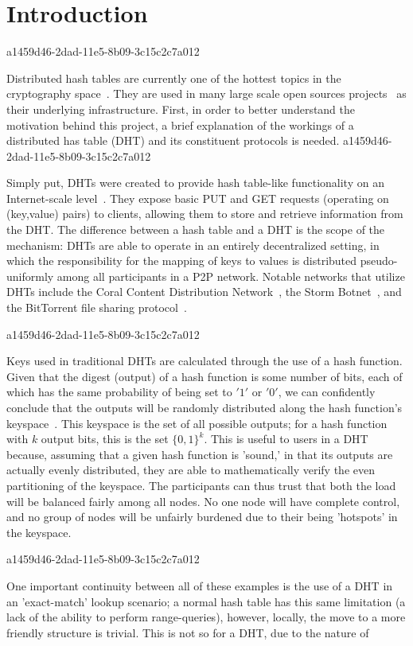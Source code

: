 \documentclass[12pt]{article}
\begin{document}
\section{Introduction}
a1459d46-2dad-11e5-8b09-3c15c2c7a012\par Distributed hash tables are currently one of the hottest topics in the cryptography space~\cite{Stoica:2001dj,Rowstron:2001ea,Ratnasamy:2001wn}. They are used in many large scale open sources projects~\cite{Freitas:2013tb,Xu:2010vs,Perfitt:2010fh} as their underlying infrastructure. First, in order to better understand the motivation behind this project, a brief explanation of the workings of a distributed has table (DHT) and its constituent protocols is needed.
a1459d46-2dad-11e5-8b09-3c15c2c7a012
\par Simply put, DHTs were created to provide hash table-like functionality on an Internet-scale level~\cite{Ratnasamy:2001wn}. They expose basic PUT and GET requests (operating on (key,value) pairs) to clients, allowing them to store and retrieve information from the DHT. The difference between a hash table and a DHT is the scope of the mechanism: DHTs are able to operate in an entirely decentralized setting, in which the responsibility for the mapping of keys to values is distributed pseudo-uniformly among all participants in a P2P network. Notable networks that utilize DHTs include the Coral Content Distribution Network~\cite{Freedman:2004vb}, the Storm Botnet~\cite{Holz:2008uk}, and the BitTorrent file sharing protocol~\cite{Cohen:y1_8mBnw}.

a1459d46-2dad-11e5-8b09-3c15c2c7a012\par Keys used in traditional DHTs are calculated through the use of a hash function. Given that the digest (output) of a hash function is some number of bits, each of which has the same probability of being set to $'1'$ or $'0'$, we can confidently conclude that the outputs will be randomly distributed along the hash function's keyspace~. This keyspace is the set of all possible outputs; for a hash function with $k$ output bits, this is the set $\{0,1\}^k$. This is useful to users in a DHT because, assuming that a given hash function is 'sound,' in that its outputs are actually evenly distributed, they are able to mathematically verify the even partitioning of the keyspace. The participants can thus trust that both the load will be balanced fairly among all nodes. No one node will have complete control, and no group of nodes will be unfairly burdened due to their being 'hotspots' in the keyspace.~

a1459d46-2dad-11e5-8b09-3c15c2c7a012\par One important continuity between all of these examples is the use of a DHT in an 'exact-match' lookup scenario; a normal hash table has this same limitation (a lack of the ability to perform range-queries), however, locally, the move to a more friendly structure is trivial. This is not so for a DHT, due to the nature of
\printbibliography
\end{document}
